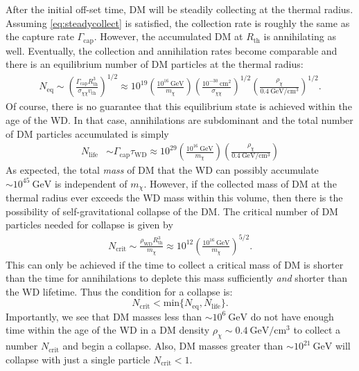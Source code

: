 \documentclass[preprintnumbers,amsmath,amssymb,prd,superscriptaddress]{revtex4}
\newcommand{\GeV}{\text{GeV}}
\newcommand{\cm}{\text{cm}}
\def\r{\right)}
\def\l{\left(}
\begin{document}
After the initial off-set time, DM will be steadily collecting at the thermal radius.
Assuming \eqref{eq:steadycollect} is satisfied, the collection rate is roughly the same as the capture rate $\Gamma_\text{cap}$. 
However, the accumulated DM at $R_\text{th}$ is annihilating as well. 
Eventually, the collection and annihilation rates become comparable and there is an equilibrium number of DM particles at the thermal radius:
\begin{align}
N_\text{eq} \sim \l \frac{\Gamma_\text{cap} R_\text{th}^3}{\sigma_{\chi \chi} v_\text{th}} \r^{1/2} \approx 10^{19} \l \frac{10^{16} ~\GeV}{m_\chi} \r \l \frac{10^{-30} ~\cm^2}{\sigma_{\chi \chi}} \r^{1/2} \l \frac{\rho_\chi}{0.4 ~\GeV/\cm^3} \r^{1/2}.
\end{align}
Of course, there is no guarantee that this equilibrium state is achieved within the age of the WD. 
In that case, annihilations are subdominant and the total number of DM particles accumulated is simply
\begin{align}
N_\text{life} &\sim \Gamma_\text{cap} \tau_\text{WD} \approx 10^{29}  \l \frac{10^{16} ~\GeV}{m_\chi} \r \l \frac{\rho_\chi}{0.4 ~\GeV/\cm^3} \r
\end{align}
As expected, the total \emph{mass} of DM that the WD can possibly accumulate $\sim 10^{45} ~\GeV$ is independent of $m_\chi$. 
However, if the collected mass of DM at the thermal radius ever exceeds the WD mass within this volume, then there is the possibility of self-gravitational collapse of the DM.
The critical number of DM particles needed for collapse is given by
\begin{align}
\label{eq:Ncore}
    N_\text{crit} \sim \frac{\rho_\text{WD} R^3_\text{th}}{m_\chi} \approx 10^{12} \l \frac{10^{16} ~\GeV}{m_\chi} \r^{5/2}. \nonumber
\end{align}
This can only be achieved if the time to collect a critical mass of DM is shorter than the time for annihilations to deplete this mass sufficiently \emph{and} shorter than the WD lifetime. 
Thus the condition for a collapse is:
\begin{equation}
\label{eq:collapsecondition}
N_\text{crit} < \text{min}\{N_\text{eq}, N_\text{life}\}. 
\end{equation}
Importantly, we see that DM masses less than $\sim 10^{6} ~\GeV$ do not have enough time within the age of the WD in a DM density $\rho_\chi \sim 0.4 ~\GeV/\cm^3$ to collect a number $N_\text{crit}$ and begin a collapse. 
Also, DM masses greater than $\sim 10^{21} ~\GeV$ will collapse with just a single particle $N_\text{crit} < 1$.
\end{document}

